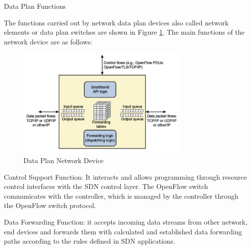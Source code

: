 \documentclass[
  oneside,
  11pt, a4paper,
  footinclude=true,
  headinclude=true,
  cleardoublepage=empty
]{scrbook}
\begin{document}




Data Plan Functions

The functions carried out by network data plan devices also called network elements or data plan switches are shown in Figure \ref{Data Plane Network Device}. The main functions of the network device are as follows:

\begin{figure}[H]
\begin{center}
  \includegraphics[width=0.75\textwidth]{img/enc.png}
\end{center}
  \caption{Data Plan Network Device ~\cite{stallings2015foundations}}
  \centering
\label{Data Plane Network Device}
\end{figure}


Control Support Function: It interacts and allows programming through resource control interfaces with the SDN control layer. The OpenFlow switch communicates with the controller, which is managed by the controller through the OpenFlow switch protocol.\par

Data Forwarding Function: it accepts incoming data streams from other network, end devices and forwards them with calculated and established data forwarding paths according to the rules defined in SDN applications.\par
\end{document}
